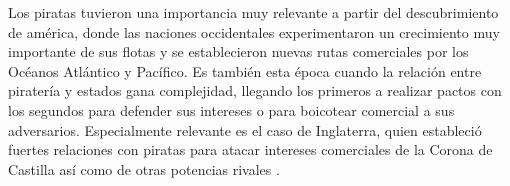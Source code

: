 \documentclass{article}
\begin{document}
Los piratas tuvieron una importancia muy relevante a partir del descubrimiento de américa, donde las naciones occidentales experimentaron un crecimiento muy importante de sus flotas y se establecieron nuevas rutas comerciales por los Océanos Atlántico y Pacífico. Es también esta época cuando la relación entre piratería y estados gana complejidad, llegando los primeros a realizar pactos con los segundos para defender sus intereses o para boicotear comercial a sus adversarios. Especialmente relevante es el caso de Inglaterra, quien estableció fuertes relaciones con piratas para atacar intereses comerciales de la Corona de Castilla así como de otras potencias rivales \cite{hebb2016}.




{}

\end{document}
